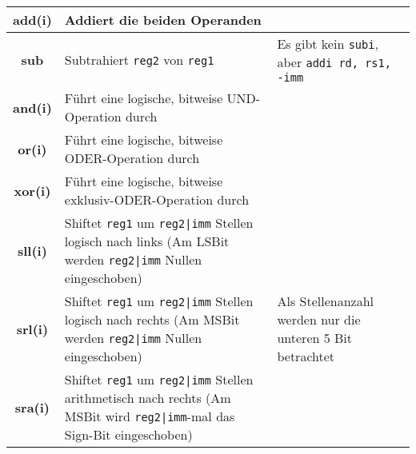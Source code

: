 \begin{tabular}{|c|p{8cm}|p{4cm}|}
	\hline
	\textbf{add(i)} & Addiert die beiden Operanden & \\
	\hline
	\textbf{sub} & Subtrahiert \texttt{reg2} von \texttt{reg1}& Es gibt kein \texttt{subi}, aber \texttt{addi rd, rs1, -imm} \\
	\hline
	\textbf{and(i)} & Führt eine logische, bitweise UND-Operation durch & \\
	\hline
	\textbf{or(i)} & Führt eine logische, bitweise ODER-Operation durch & \\
	\hline
	\textbf{xor(i)} & Führt eine logische, bitweise exklusiv-ODER-Operation durch & \\
	\hline
	\textbf{sll(i)} & Shiftet \texttt{reg1} um \texttt{reg2|imm} Stellen logisch nach links (Am LSBit werden \texttt{reg2|imm} Nullen eingeschoben) & \multirow{3}{4cm}{Als Stellenanzahl werden nur die unteren 5 Bit betrachtet} \\
	\cline{1-2}
	\textbf{srl(i)} & Shiftet \texttt{reg1} um \texttt{reg2|imm} Stellen logisch nach rechts (Am MSBit werden \texttt{reg2|imm} Nullen eingeschoben) & \\
	\cline{1-2}
	\textbf{sra(i)} & Shiftet \texttt{reg1} um \texttt{reg2|imm} Stellen arithmetisch nach rechts (Am MSBit wird \texttt{reg2|imm}-mal das Sign-Bit eingeschoben) & \\
	\hline
\end{tabular}


